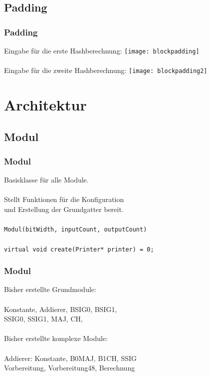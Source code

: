\documentclass{beamer}
\begin{document}
\subsection{Padding}
  \begin{frame}
    \frametitle{Padding}
    Eingabe für die erste Hashberechnung:
    \texttt{[image: blockpadding]}\\
    ~\\
    Eingabe für die zweite Hashberechnung:
    \texttt{[image: blockpadding2]}\\
  \end{frame}
\section{Architektur}
\subsection{Modul}
  \begin{frame}
    \frametitle{Modul}
    \begin{figure}
    \end{figure}
    Basisklasse für alle Module.\\
    ~\\
    Stellt Funktionen für die Konfiguration\\
    und Erstellung der Grundgatter bereit.\\
    ~\\
    \texttt{Modul(bitWidth, inputCount, outputCount)}\\
    ~\\
    \texttt{virtual void create(Printer* printer) = 0;}\\
  \end{frame}
  \begin{frame}
    \frametitle{Modul}
    \begin{figure}
    \end{figure}
    Bisher erstellte Grundmodule:\\
    ~\\
    Konstante, Addierer, BSIG0, BSIG1,\\
    SSIG0, SSIG1, MAJ, CH,\\
    ~\\
    Bisher erstellte komplexe Module:\\
    ~\\
    Addierer: Konstante, B0MAJ, B1CH, SSIG\\
    Vorbereitung, Vorbereitung48, Berechnung\\
  \end{frame}
\end{document}
